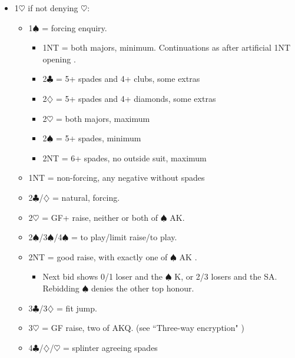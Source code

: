 \documentclass[a4paper,14pt]{extarticle}
\begin{document}
\begin{itemize}
\item 1$\heartsuit$ if not denying $\heartsuit$:
	\begin{itemize}
   \item 1$\spadesuit$ = forcing enquiry.
		\begin{itemize}
      \item 1NT = both majors, minimum. Continuations as after artificial 1NT opening .
      \item 2$\clubsuit$ = 5+ spades and 4+ clubs, some extras
      \item 2$\diamondsuit$ = 5+ spades and 4+ diamonds, some extras
      \item 2$\heartsuit$ = both majors, maximum
		\item 2$\spadesuit$ = 5+ spades, minimum
		\item 2NT = 6+ spades, no outside suit, maximum
		\end{itemize}
   \item 1NT = non-forcing, any negative without spades
   \item 2$\clubsuit$/$\diamondsuit$ = natural, forcing.
   \item 2$\heartsuit$ = GF+ raise, neither or both of $\spadesuit$ AK.
   \item 2$\spadesuit$/3$\spadesuit$/4$\spadesuit$ = to play/limit raise/to play.
   \item 2NT = good raise, with exactly one of $\spadesuit$ AK .
		\begin{itemize}
      \item Next bid shows 0/1 loser and the $\spadesuit$ K, or 2/3 losers and the SA.
         Rebidding $\spadesuit$ denies the other top honour.
		\end{itemize}
   \item 3$\clubsuit$/3$\diamondsuit$ = fit jump.
   \item 3$\heartsuit$ = GF raise, two of AKQ. (see ``Three-way encryption" )
   \item 4$\clubsuit$/$\diamondsuit$/$\heartsuit$ = splinter agreeing spades
	\end{itemize}

\newpage


\end{itemize}
\end{document}
